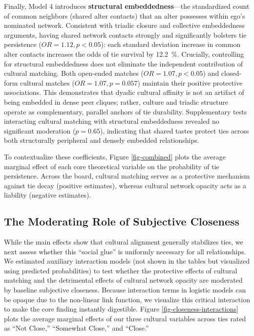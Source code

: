 \documentclass[
  letterpaper,
  DIV=11,
  numbers=noendperiod]{scrartcl}
\def\percent{\%}%
\begin{document}
Finally, Model 4 introduces \textbf{structural embeddedness}---the standardized count of common neighbors (shared alter contacts) that an alter possesses within ego's nominated network. Consistent with triadic closure and collective embeddedness arguments, having shared network contacts strongly and significantly bolsters tie persistence ($OR = 1.12, p < 0.05$): each standard deviation increase in common alter contacts increases the odds of tie survival by \SI{12.2}{\percent}. Crucially, controlling for structural embeddedness does not eliminate the independent contribution of cultural matching. Both open-ended matches ($OR = 1.07, p < 0.05$) and closed-form cultural matches ($OR = 1.07, p = 0.057$) maintain their positive protective associations. This demonstrates that dyadic cultural affinity is not an artifact of being embedded in dense peer cliques; rather, culture and triadic structure operate as complementary, parallel anchors of tie durability. Supplementary tests interacting cultural matching with structural embeddedness revealed no significant moderation ($p = 0.65$), indicating that shared tastes protect ties across both structurally peripheral and densely embedded relationships.

To contextualize these coefficients, Figure \ref{fig-combined} plots the average marginal effect of each core theoretical variable on the probability of tie persistence. Across the board, cultural matching serves as a protective mechanism against tie decay (positive estimates), whereas cultural network opacity acts as a liability (negative estimates).




\subsection{The Moderating Role of Subjective Closeness}

While the main effects show that cultural alignment generally stabilizes ties, we next assess whether this ``social glue'' is uniformly necessary for all relationships. We estimated auxiliary interaction models (not shown in the tables but visualized using predicted probabilities) to test whether the protective effects of cultural matching and the detrimental effects of cultural network opacity are moderated by baseline subjective closeness. Because interaction terms in logistic models can be opaque due to the non-linear link function, we visualize this critical interaction to make the core finding instantly digestible. Figure \ref{fig-closeness-interactions} plots the average marginal effects of our three cultural variables across ties rated as ``Not Close,'' ``Somewhat Close,'' and ``Close.''
\end{document}
